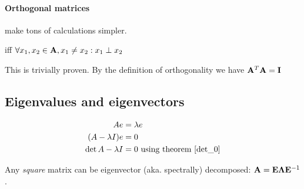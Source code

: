 \begin{theorem}
    [$\rank{A} = \rank{A^T A}$]
\end{theorem}

\begin{theorem}
    [$A^T A: \PSD$]
\end{theorem}


\paragraph{Orthogonal matrices} make tons of calculations simpler.
\begin{definition} iff $\forall x_1, x_2 \in \mathbf{A}, x_1 \neq x_2: x_1 \perp x_2$
\end{definition}

\begin{theorem}
    [If $A$ is orthogonal, than $A^{-1} = A^T$.]
    This is trivially proven. By the definition of orthogonality we have $\mathbf{A}^T \mathbf{A} = \mathbf{I}$
\end{theorem}








\subsection{Eigenvalues and eigenvectors}

\begin{equation}
    \begin{aligned}
        A e &= \lambda e \\
        ( A - \lambda I ) e &= 0 \\
        \det{A - \lambda I} &= 0 \text{ using theorem \ref{det_0}}
    \end{aligned}
\end{equation}

Any \emph{square} matrix can be eigenvector (aka. spectrally) decomposed: $\mathbf{A} = \mathbf{E} \mathbf{\Lambda}\mathbf{E}^{-1}$.



